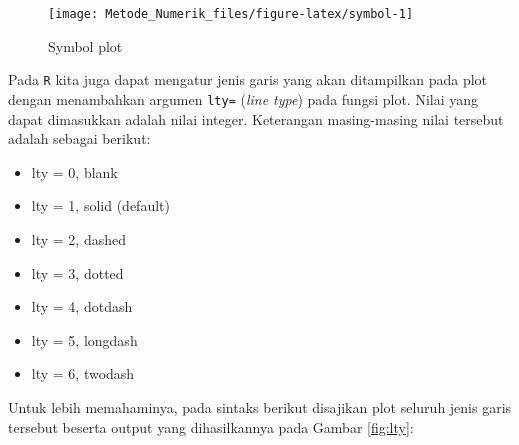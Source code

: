 \documentclass[]{book}
\providecommand{\tightlist}{%
  \setlength{\itemsep}{0pt}\setlength{\parskip}{0pt}}
\theoremstyle{definition}
\theoremstyle{definition}
\theoremstyle{definition}
\theoremstyle{remark}
\begin{document}
\begin{figure}

{\centering \texttt{[image: Metode\_Numerik\_files/figure-latex/symbol-1]} 

}

\caption{Symbol plot}\label{fig:symbol}
\end{figure}

Pada \texttt{R} kita juga dapat mengatur jenis garis yang akan ditampilkan pada plot dengan menambahkan argumen \texttt{lty=} (\emph{line type}) pada fungsi plot. Nilai yang dapat dimasukkan adalah nilai integer. Keterangan masing-masing nilai tersebut adalah sebagai berikut:

\begin{itemize}
\tightlist
\item
  lty = 0, blank
\item
  lty = 1, solid (default)
\item
  lty = 2, dashed
\item
  lty = 3, dotted
\item
  lty = 4, dotdash
\item
  lty = 5, longdash
\item
  lty = 6, twodash
\end{itemize}

Untuk lebih memahaminya, pada sintaks berikut disajikan plot seluruh jenis garis tersebut beserta output yang dihasilkannya pada Gambar \ref{fig:lty}:
\end{document}
